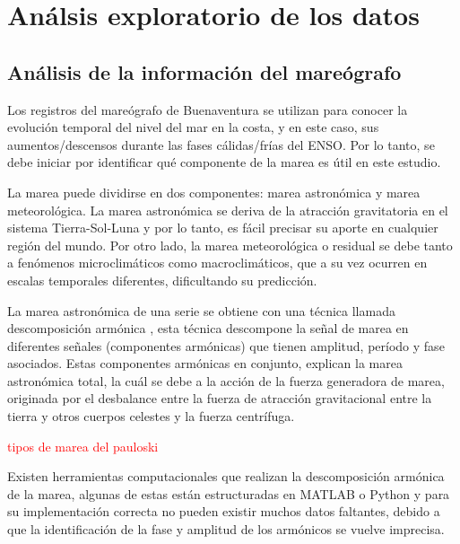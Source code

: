 \section{Análsis exploratorio de los datos}

\subsection{Análisis de la información del mareógrafo}

Los registros del mareógrafo de Buenaventura se utilizan para conocer la evolución temporal del nivel del mar en la costa, y en este caso, sus aumentos/descensos durante las fases cálidas/frías del ENSO. Por lo tanto, se debe iniciar por identificar qué componente de la marea es útil en este estudio.

La marea puede dividirse en dos componentes: marea astronómica y marea meteorológica. La marea astronómica se deriva de la atracción gravitatoria en el sistema Tierra-Sol-Luna y por lo tanto, es fácil precisar su aporte en cualquier región del mundo. Por otro lado, la marea meteorológica o residual se debe tanto a fenómenos microclimáticos como macroclimáticos, que a su vez ocurren en escalas temporales diferentes, dificultando su predicción.

La marea astronómica de una serie se obtiene con una técnica llamada descomposición armónica \cite{Dronkers1975}, esta técnica descompone la señal de marea en diferentes señales (componentes armónicas) que tienen amplitud, período y fase asociados. Estas componentes armónicas en conjunto, explican la marea astronómica total, la cuál se debe a la acción de la fuerza generadora de marea, originada por el desbalance entre la fuerza de atracción gravitacional entre la tierra y otros cuerpos celestes y la fuerza centrífuga.

\textcolor{red}{tipos de marea del pauloski}

Existen herramientas computacionales que realizan la descomposición armónica de la marea, algunas de estas están estructuradas en MATLAB o Python \cite{Pawlowicz2002} y para su implementación correcta no pueden existir muchos datos faltantes, debido a que la identificación de la fase y amplitud de los armónicos se vuelve imprecisa. 

